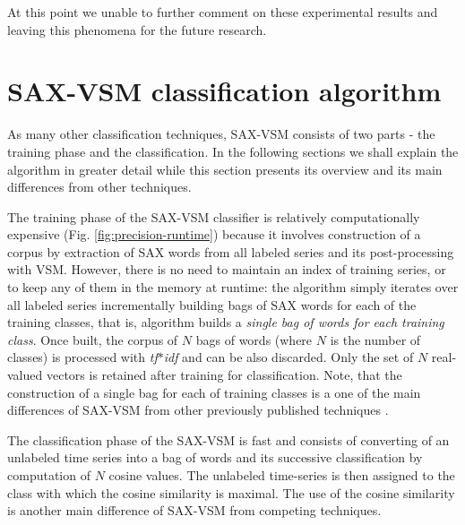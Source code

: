 \documentclass{llncs}
\begin{document}
At this point we unable to further comment on these experimental results and 
leaving this phenomena for the future research.

\section{SAX-VSM classification algorithm }
As many other classification techniques, SAX-VSM consists of two parts - the training phase 
and the classification. In the following sections we shall explain the algorithm in greater detail 
while this section presents its overview and its main differences from other techniques.

The training phase of the SAX-VSM classifier is relatively computationally expensive 
(Fig. \ref{fig:precision-runtime}) because it involves construction of a corpus by
extraction of SAX words from all labeled series and its post-processing with VSM. 
However, there is no need to maintain an index of training series, or to keep any of 
them in the memory at runtime: the algorithm simply iterates over all labeled series
incrementally building bags of SAX words for each of the training classes, 
that is, algorithm builds a \textit{single bag of words for each training class}. 
Once built, the corpus of $N$ bags of words (where $N$ is the number of classes) is
processed with \textit{tf$\ast$idf} and can be also discarded. 
Only the set of $N$ real-valued vectors is retained after training for classification. 
Note, that the construction of a single bag for each of training classes is a one 
of the main differences of SAX-VSM from other previously published 
techniques \cite{bag_patterns}.

The classification phase of the SAX-VSM is fast and consists of converting of an 
unlabeled time series into a bag of words and its successive classification by 
computation of $N$ cosine values. The unlabeled time-series is then assigned to 
the class with which the cosine similarity is maximal. The use of the cosine 
similarity is another main difference of SAX-VSM from competing techniques.
\end{document}

